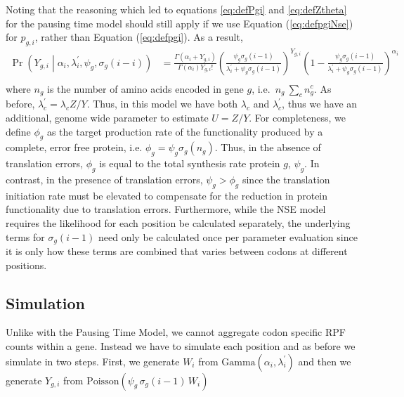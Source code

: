 \documentclass{article}
\newcommand{\alphai}{\ensuremath{{\alpha_i}}\xspace}
\newcommand{\lambdac}{\ensuremath{{\lambda_c}}\xspace}
\newcommand{\lambdacprime}{\ensuremath{{\lambda_c^\prime}}\xspace}
\newcommand{\lambdaiprime}{\ensuremath{{\lambda_i^\prime}}\xspace}
\newcommand{\sigmag}{\ensuremath{\sigma_{g}}\xspace}
\newcommand{\pgi}{\ensuremath{{p_{g,i}}}\xspace}
\newcommand{\ngc}{\ensuremath{{n_{g}^c}}\xspace}
\renewcommand{\ng}{\ensuremath{{n_{g}}}\xspace}
\newcommand{\psig}{\ensuremath{{\psi_g}}\xspace}
\newcommand{\phig}{\ensuremath{{\phi_g}}\xspace}
\newcommand{\Ztheta}{\ensuremath{{Z}}\xspace}
\newcommand{\Ytotal}{\ensuremath{{Y}}\xspace}
\newcommand{\Ygi}{\ensuremath{{Y_{g,i}}}\xspace}
\begin{document}
Noting that the reasoning which led to equations \ref{eq:defPgi} and \ref{eq:defZtheta} for the pausing time model should still apply if we use Equation (\ref{eq:defpgiNse}) for \pgi, rather than Equation (\ref{eq:defpgi}). 
As a result,
\begin{align}
  \label{eq:distYgSiteNse}
  \Pr\left(\Ygi \middle| \alphai, \lambdaiprime, \psig, \sigmag(i-i)\right) 
  &= \frac{\Gamma\left(\alphai + \Ygi\right)}{\Gamma\left(\alphai\right) \Ygi!} 
  \left(\frac{\psig \sigmag(i-1)}{\lambdaiprime + \psig \sigmag(i-1)}\right)^\Ygi \left(1-\frac{\psig\sigmag(i-1)}{\lambdaiprime + \psig \sigmag(i-1)}\right)^\alphai\\
\end{align}
where \ng is the number of amino acids encoded in gene $g$, i.e.~$\ng \ \sum_c \ngc$.
As before, $\lambdacprime = \lambdac \Ztheta/\Ytotal$.
Thus, in this model we have both $\lambdac$ and $\lambdacprime$, thus we have an additional, genome wide parameter to estimate $U = \Ztheta/\Ytotal$.
For completeness, we  define $\phig$ as the target production rate of the functionality produced by a complete, error free protein, i.e. $\phig = \psig \sigmag(\ng)$.
Thus, in the absence of translation errors, $\phig$ is equal to the total synthesis rate protein $g$, $\psig$.
In contrast, in the presence of translation errors, $\psig > \phig$ since the translation initiation rate must be elevated to compensate for the reduction in protein functionality due to translation errors.
Furthermore, while the NSE model requires the likelihood for each position be calculated separately, the underlying terms for $\sigmag(i-1)$ need only be calculated once per parameter evaluation since it is only how these terms are combined that varies between codons at different positions.



\subsection*{Simulation}
Unlike with the Pausing Time Model, we cannot aggregate codon specific RPF counts within a gene.
Instead we have to simulate each position and as before we simulate in two steps.
First, we generate $W_i$  from $\text{Gamma}(\alphai, \lambdaiprime)$ and then we generate $\Ygi$ from $\text{Poisson}\left(\psi_g \, \sigmag(i-1)\, W_i\right)$
\end{document}
